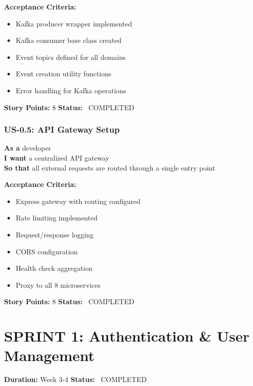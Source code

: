 \documentclass[11pt,a4paper]{article}
\begin{document}
\textbf{Acceptance Criteria:}
\begin{itemize}[label=\textcolor{successgreen}{\faCheck}]
    \item Kafka producer wrapper implemented
    \item Kafka consumer base class created
    \item Event topics defined for all domains
    \item Event creation utility functions
    \item Error handling for Kafka operations
\end{itemize}

\textbf{Story Points:} 8 \hfill \textbf{Status:} \textcolor{successgreen}{\faCheckCircle\ COMPLETED}

\vspace{0.5cm}

\subsubsection{US-0.5: API Gateway Setup}
\begin{tcolorbox}[colback=white,colframe=primaryblue]
\textbf{As a} developer\\
\textbf{I want} a centralized API gateway\\
\textbf{So that} all external requests are routed through a single entry point
\end{tcolorbox}

\textbf{Acceptance Criteria:}
\begin{itemize}[label=\textcolor{successgreen}{\faCheck}]
    \item Express gateway with routing configured
    \item Rate limiting implemented
    \item Request/response logging
    \item CORS configuration
    \item Health check aggregation
    \item Proxy to all 8 microservices
\end{itemize}

\textbf{Story Points:} 8 \hfill \textbf{Status:} \textcolor{successgreen}{\faCheckCircle\ COMPLETED}

\newpage

\section{SPRINT 1: Authentication \& User Management}
\textbf{Duration:} Week 3-4 \hfill \textbf{Status:} \textcolor{successgreen}{\faCheckCircle\ COMPLETED}
\end{document}

